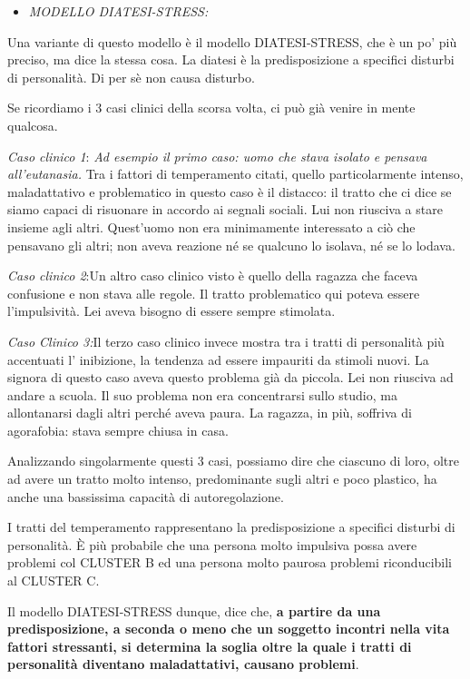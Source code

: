 \documentclass[]{article}
\begin{document}
\begin{itemize}
\item
  \emph{MODELLO DIATESI-STRESS:}
\end{itemize}

Una variante di questo modello è il modello DIATESI-STRESS, che è un po'
più preciso, ma dice la stessa cosa. La diatesi è la predisposizione a
specifici disturbi di personalità. Di per sè non causa disturbo.

Se ricordiamo i 3 casi clinici della scorsa volta, ci può già venire in
mente qualcosa.

\emph{Caso clinico 1}: \emph{Ad esempio il primo caso: uomo che stava
isolato e pensava all'eutanasia.} Tra i fattori di temperamento citati,
quello particolarmente intenso, maladattativo e problematico in questo
caso è il distacco: il tratto che ci dice se siamo capaci di risuonare
in accordo ai segnali sociali. Lui non riusciva a stare insieme agli
altri. Quest'uomo non era minimamente interessato a ciò che pensavano
gli altri; non aveva reazione né se qualcuno lo isolava, né se lo
lodava.

\emph{Caso clinico 2}:Un altro caso clinico visto è quello della ragazza
che faceva confusione e non stava alle regole. Il tratto problematico
qui poteva essere l'impulsività. Lei aveva bisogno di essere sempre
stimolata.

\emph{Caso Clinico 3:}Il terzo caso clinico invece mostra tra i tratti
di personalità più accentuati l' inibizione, la tendenza ad essere
impauriti da stimoli nuovi. La signora di questo caso aveva questo
problema già da piccola. Lei non riusciva ad andare a scuola. Il suo
problema non era concentrarsi sullo studio, ma allontanarsi dagli altri
perché aveva paura. La ragazza, in più, soffriva di agorafobia: stava
sempre chiusa in casa.

Analizzando singolarmente questi 3 casi, possiamo dire che ciascuno di
loro, oltre ad avere un tratto molto intenso, predominante sugli altri e
poco plastico, ha anche una bassissima capacità di autoregolazione.

I tratti del temperamento rappresentano la predisposizione a specifici
disturbi di personalità. È più probabile che una persona molto impulsiva
possa avere problemi col CLUSTER B ed una persona molto paurosa problemi
riconducibili al CLUSTER C.

Il modello DIATESI-STRESS dunque, dice che, \textbf{a partire da una
predisposizione, a seconda o meno che un soggetto incontri nella vita
fattori stressanti, si determina la soglia oltre la quale i tratti di
personalità diventano maladattativi, causano problemi}.
\end{document}
